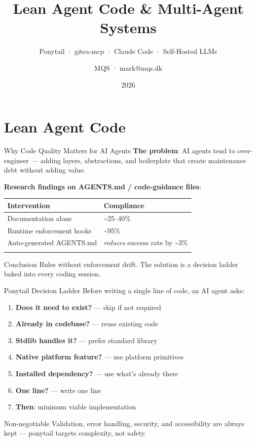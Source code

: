 \documentclass[
  ignorenonframetext,
  aspectratio=169,
]{beamer}
\title{Lean Agent Code \& Multi-Agent Systems}
\subtitle{Ponytail · gitea-mcp · Claude Code · Self-Hosted LLMs}
\author{MQS · mark@mqs.dk}
\date{2026}
\institute{Modular Quantum Solutions}
\providecommand{\tightlist}{%
  \setlength{\itemsep}{0pt}\setlength{\parskip}{0pt}}
\begin{document}
\frame{\titlepage}

\section{Lean Agent Code}\label{lean-agent-code}

\begin{frame}{Why Code Quality Matters for AI Agents}
\label{why-code-quality-matters-for-ai-agents}
\textbf{The problem}: AI agents tend to over-engineer --- adding layers,
abstractions, and boilerplate that create maintenance debt without
adding value.

\textbf{Research findings on AGENTS.md / code-guidance files}:

\begin{longtable}[]{@{}ll@{}}
\toprule\noalign{}
Intervention & Compliance \\
\midrule\noalign{}
\endhead
Documentation alone & \textasciitilde25--40\% \\
Runtime enforcement hooks & \textasciitilde95\% \\
Auto-generated AGENTS.md & \emph{reduces} success rate by
\textasciitilde3\% \\
\bottomrule\noalign{}
\end{longtable}

\vspace{0.3em}
\begin{block}{Conclusion}
Rules without enforcement drift. The solution is a decision ladder baked into every coding session.
\end{block}
\end{frame}

\begin{frame}{Ponytail Decision Ladder}
\label{ponytail-decision-ladder}
Before writing a single line of code, an AI agent asks:

\begin{enumerate}
\tightlist
\item
  \textbf{Does it need to exist?} --- skip if not required
\item
  \textbf{Already in codebase?} --- reuse existing code
\item
  \textbf{Stdlib handles it?} --- prefer standard library
\item
  \textbf{Native platform feature?} --- use platform primitives
\item
  \textbf{Installed dependency?} --- use what's already there
\item
  \textbf{One line?} --- write one line
\item
  \textbf{Then}: minimum viable implementation
\end{enumerate}

\vspace{0.3em}
\begin{block}{Non-negotiable}
Validation, error handling, security, and accessibility are always kept — ponytail targets complexity, not safety.
\end{block}
\end{frame}
\end{document}
